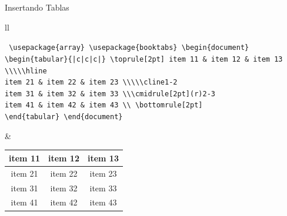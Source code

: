 \documentclass[12pt]{beamer}
\begin{document}
\begin{frame}{Insertando Tablas}
  \begin{center}
       \begin{tabular}{ll} 
         \begin{minipage}{0.5\textwidth}
           \begin{block}{}
             \footnotesize
             \texttt{\color{blue}
             \textbackslash usepackage\{array\}
             \textbackslash usepackage\{booktabs\}
             \textbackslash begin\{document\}
             \textbackslash begin\{tabular\}\{|c|c|c|\}
             \textbackslash toprule[2pt]
              item 11 \& item 12 \& item 13 \textbackslash\textbackslash\textbackslash\textbackslash\textbackslash hline\\
              item 21 \& item 22 \& item 23 \textbackslash\textbackslash\textbackslash\textbackslash \textbackslash cline{1-2}\\
              item 31 \& item 32 \& item 33 \textbackslash\textbackslash\textbackslash cmidrule[2pt](r){2-3}\\
              item 41 \& item 42 \& item 43 \textbackslash\textbackslash
              \textbackslash bottomrule[2pt]\\
              \textbackslash end\{tabular\}
              \textbackslash end\{document\}}
           \end{block}
         \end{minipage} &
       \begin{minipage}{0.5\textwidth}
        \footnotesize
    \begin{tabular}{|c|c|c|}
      \toprule[2pt]
     item 11 & item 12 & item 13 \\\hline
     item 21 & item 22 & item 23 \\\cline{1-2}
     item 31 & item 32 & item 33 \\\cmidrule[2pt](r){2-3}
     item 41 & item 42 & item 43 \\
      \bottomrule[2pt]    
    \end{tabular}    
       \end{minipage} 
     \end{tabular}
  \end{center}
\end{frame}
\end{document}
